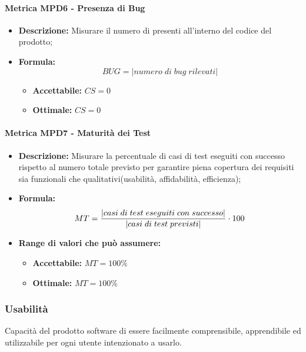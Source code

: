 \paragraph{Metrica MPD6 - Presenza di Bug} %
\begin{itemize}
	\item \textbf{Descrizione:} Misurare il numero di  presenti all'interno del codice del prodotto;
	\item \textbf{Formula:} $$BUG = {|numero \; di \; bug \; rilevati|}$$
		\begin{itemize}
		\item \textbf{Accettabile:} $CS = 0 $
		\item \textbf{Ottimale:} $CS = 0 $
	\end{itemize}
\end{itemize}

\paragraph{Metrica MPD7 - Maturità dei Test} 
\begin{itemize}
	\item \textbf{Descrizione:} Misurare la percentuale di casi di test eseguiti con successo rispetto al numero totale previsto per garantire piena copertura dei requisiti sia funzionali che qualitativi(usabilità, affidabilità, efficienza);
	\item \textbf{Formula:} $$MT = {|casi \; di \; test \; eseguiti \; con \; successo| \over |casi \; di \; test \; previsti|} \cdot 100$$
	\item \textbf{Range di valori che può assumere:}
	\begin{itemize}
		\item \textbf{Accettabile:} $MT = 100\% $
		\item \textbf{Ottimale:} $MT = 100\% $
	\end{itemize}
\end{itemize}

       
\subsubsection{Usabilità}
Capacità del prodotto software di essere facilmente comprensibile, apprendibile ed utilizzabile per ogni utente intenzionato a usarlo.

